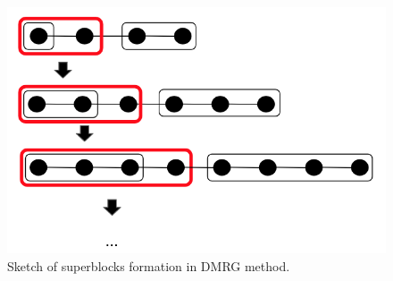 \begin{figure}[H]
    \centering
    \includegraphics[scale=0.5]{Figures/dmrg_superblock_sketch.png}
    \captionsetup{width=1.\linewidth}
    \caption{Sketch of superblocks formation in DMRG method.} %
    \label{fig:DMRG_superblockSketch}
\end{figure}

